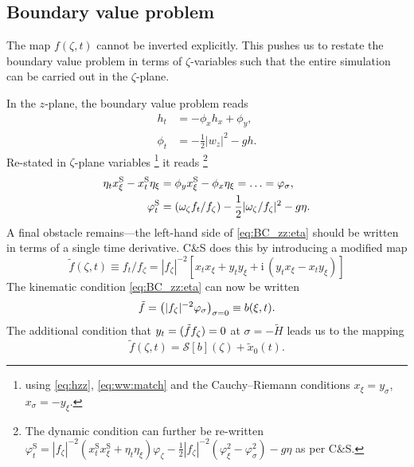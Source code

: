\documentclass[a4paper,12pt]{article}
\newcommand{\mr}{\mathrm}
\newcommand{\mc}{\mathcal}
\renewcommand{\S}{^\mr{S}}
\newcommand{\ii}{\mr{i}\,}
\renewcommand{\_}[1]{_\mr{#1}}
\let\Re\relax
\let\Im\relax
\DeclareMathOperator\Re{Re}
\DeclareMathOperator\Im{Im}
\newcommand{\rbr}[1]{\left(#1\right)}
\newcommand{\refCS}{C\&S}
\newcommand{\z}{z}
\newcommand{\x}{x}
\newcommand{\y}{y}
\newcommand{\zz}{\zeta}
\newcommand{\xx}{\xi}
\newcommand{\yy}{\sigma}
\newcommand{\zmap}{f}
\newcommand{\ww}{\omega}
\newcommand{\Hzz}{\tilde H}
\newcommand{\hzz}{\eta}
\newcommand{\Lsin}{\mc S}
\newcommand{\xS}{\x\S}
\newcommand{\tf}{\tilde \zmap}
\begin{document}
\subsection*{Boundary value problem}
The map $\zmap(\zz,t)$ cannot be inverted explicitly. 
This pushes us to restate the boundary value problem in terms of $\zz$-variables such that the entire simulation can be carried out in the $\zz$-plane.

In the $\z$-plane, the boundary value problem reads 
\begin{align*}
h_t &=- \phi_x h_x+\phi_y,\\
\phi_t &=- \frac12|w_\z|^2-gh.
\end{align*}
Re-stated in $\zz$-plane variables%
\footnote{using \eqref{eq:hzz}, \eqref{eq:ww:match} and the Cauchy--Riemann conditions $x_\xx = y_\yy$, $x_\yy=-y_\xx$.}
 it reads%
 \footnote{The dynamic condition can further be re-written
$\varphi\S_t = |\zmap_\zz|^{-2} (\xS_t\xS_\xx + \hzz_t\hzz_\xx)\varphi_\zz - \frac12 |\zmap_\zz|^{-2} \rbr{\varphi_\xx^2-\varphi_\yy^2}  - g \hzz$ as per \refCS{}.} 
\begin{subequations}
\begin{align}
\hzz_t\xS_\xx - \xS_t\hzz_\xx &= \phi_\y\xS_\xx-\phi_\x\hzz_\xx = \ldots = \varphi_\yy, \label{eq:BC_zz:eta} \\
\varphi\S_t &= \Re(\ww_\zz f_t/ f_\zz)  - \frac12 |\ww_\zz/ f_\zz|^2  - g \hzz.\label{eq:BC_zz:phi}
\end{align}%
\label{eq:BC_zz}%
\end{subequations}%
A final obstacle remains---the left-hand side of \eqref{eq:BC_zz:eta} should be written in terms of a single time derivative.
\refCS{} does this by introducing a modified map
\begin{equation}
\tf(\zz,t)\equiv\zmap_t/\zmap_\zz = |\zmap_\zz|^{-2}[\x_t\x_\xx + \y_t\y_\xx +\ii(\y_t\x_\xx - \x_t\y_\xx ) ]
\label{eq:tf}
\end{equation}
The kinematic condition \eqref{eq:BC_zz:eta} can now be written
\begin{equation}
\Im \tf = \big(|\zmap_\zz|^{-2}\varphi_\yy\big)_{\yy=0} \equiv b(\xx,t).
\label{eq:BC_zz2:eta}%
\end{equation}%
The additional condition that $\y_t=\Im(\tf\zmap_\zz)=0$ at $\yy=-\Hzz$ leads us to the mapping
\begin{equation}
\tf(\zz,t) = \Lsin[b](\zz) + \tilde x_{0}(t).
\label{eq:tfMap}
\end{equation}
\end{document}
